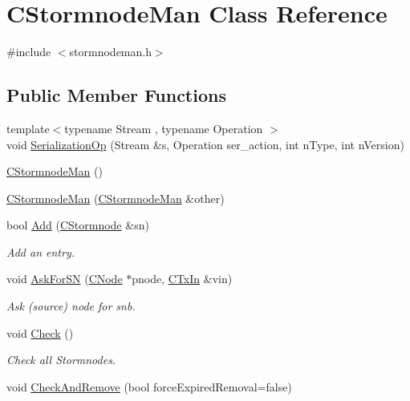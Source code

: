 \hypertarget{class_c_stormnode_man}{}\section{C\+Stormnode\+Man Class Reference}
\label{class_c_stormnode_man}


{\ttfamily \#include $<$stormnodeman.\+h$>$}

\subsection*{Public Member Functions}
\begin{DoxyCompactItemize}
\item 
{\footnotesize template$<$typename Stream , typename Operation $>$ }\\void \hyperlink{class_c_stormnode_man_a2eb7be1ad46598e33b6c60248bc7b7e1}{Serialization\+Op} (Stream \&s, Operation ser\+\_\+action, int n\+Type, int n\+Version)
\item 
\hyperlink{class_c_stormnode_man_a72855bd5da6330e45c0964f6e1f9ade1}{C\+Stormnode\+Man} ()
\item 
\hyperlink{class_c_stormnode_man_a0870cfe9ca46157c0e6ad9cf9f9cc1d7}{C\+Stormnode\+Man} (\hyperlink{class_c_stormnode_man}{C\+Stormnode\+Man} \&other)
\item 
bool \hyperlink{class_c_stormnode_man_aa4a3ed2fe6508a7922e7b7bd1cbf89c3}{Add} (\hyperlink{class_c_stormnode}{C\+Stormnode} \&sn)
\begin{DoxyCompactList}\small\item\em Add an entry. \end{DoxyCompactList}\item 
void \hyperlink{class_c_stormnode_man_a918a4ccb668808449809a77adc036301}{Ask\+For\+S\+N} (\hyperlink{class_c_node}{C\+Node} $\ast$pnode, \hyperlink{class_c_tx_in}{C\+Tx\+In} \&vin)
\begin{DoxyCompactList}\small\item\em Ask (source) node for snb. \end{DoxyCompactList}\item 
void \hyperlink{class_c_stormnode_man_a2e0f73af79892b3f86b7d1b07eaa85ce}{Check} ()
\begin{DoxyCompactList}\small\item\em Check all Stormnodes. \end{DoxyCompactList}\item 
void \hyperlink{class_c_stormnode_man_a6d8c3a832ea7d6f4780a59e2ae0441b8}{Check\+And\+Remove} (bool force\+Expired\+Removal=false)

\end{DoxyCompactItemize}
